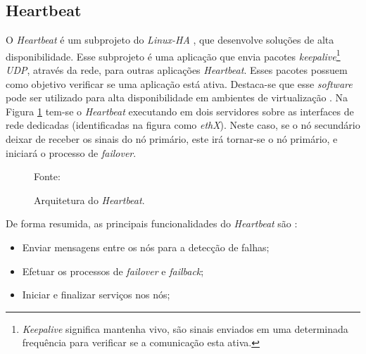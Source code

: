 
\subsection{Heartbeat}
\label{section:heartbeat}
O \textit{Heartbeat} é um subprojeto do \textit{Linux-HA} \cite{linuxha}, que desenvolve soluções de alta disponibilidade.
Esse subprojeto é uma aplicação que envia pacotes \textit{keepalive}\footnote{\textit{Keepalive} significa mantenha vivo, são sinais 
enviados em uma determinada frequência para verificar se a comunicação esta ativa.} \textit{\ac{UDP}}, 
através da rede, para outras aplicações \textit{Heartbeat}. Esses pacotes possuem como objetivo verificar se uma aplicação está ativa.
Destaca-se que esse \textit{software} pode ser utilizado para alta disponibilidade em ambientes de virtualização \cite{reis2009}.
Na Figura \ref{fig:heartbeat} tem-se o \textit{Heartbeat} executando em dois servidores sobre as interfaces de rede dedicadas (identificadas na 
figura como \textit{ethX}).
Neste caso, se o nó secundário deixar de receber os sinais do nó primário, este irá tornar-se o nó primário, e iniciará o processo de 
\textit{failover}. 
\begin{figure}[h!]
 \centering
 \caption{Arquitetura do \textit{Heartbeat}.}
 Fonte: \citet{zaminhani2008}
 \label{fig:heartbeat}
\end{figure}

De forma resumida, as principais funcionalidades do \textit{Heartbeat} são \cite{clusterlabs}:
\begin{itemize}
 \item Enviar mensagens entre os nós para a detecção de falhas;
 \item Efetuar os processos de \textit{failover} e \textit{failback};
 \item Iniciar e finalizar serviços nos nós;
\end{itemize}

